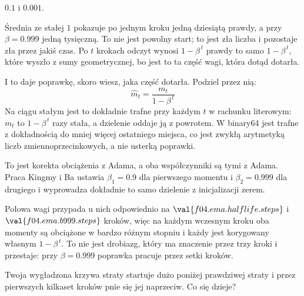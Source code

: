 \begin{fr}
\begin{ansblock}
$\num{0.1}$ i $\num{0.001}$.
\end{ansblock}

Średnia ze stałej $1$ pokazuje po jednym kroku jedną dziesiątą prawdy, a
przy $\beta = \num{0.999}$ jedną tysięczną. To nie jest powolny start; to jest
zła liczba i pozostaje zła przez jakiś czas. Po $t$ krokach odczyt wynosi
$1 - \beta^{\,t}$ prawdy \dash{} to samo $1 - \beta^{\,t}$, które wyszło z
sumy geometrycznej, bo jest to ta część wagi, która dotąd dotarła.

I to daje poprawkę, skoro wiesz, jaka część dotarła. Podziel przez nią:
\[ \hat{m}_t = \frac{m_t}{1 - \beta^{\,t}} \]
Na ciągu stałym jest to dokładnie trafne przy każdym $t$ w rachunku
literowym: $m_t$ to $1 - \beta^{\,t}$ razy stała, a dzielenie oddaje ją z
powrotem. W binary64 jest trafne z dokładnością do mniej więcej ostatniego
miejsca, co jest zwykłą arytmetyką liczb zmiennoprzecinkowych, a nie usterką
poprawki.

\begin{aibox}
To jest korekta obciążenia z Adama, a oba współczynniki są tymi z Adama.
Praca Kingmy i Ba ustawia $\beta_1 = \num{0.9}$ dla pierwszego momentu i
$\beta_2 = \num{0.999}$ dla drugiego i wyprowadza dokładnie to samo dzielenie
z inicjalizacji zerem.

Połowa wagi przypada u nich odpowiednio na $\val{f04.ema.halflife.steps}$ i
$\val{f04.ema.b999.steps}$ kroków, więc na każdym wczesnym kroku oba momenty
są obciążone w bardzo różnym stopniu i każdy jest korygowany własnym
$1 - \beta^{\,t}$. To nie jest drobiazg, który ma znaczenie przez trzy kroki i
przestaje: przy $\beta = \num{0.999}$ poprawka pracuje przez setki kroków.
\end{aibox}

Twoja wygładzona krzywa straty startuje dużo poniżej prawdziwej straty i przez
pierwszych kilkaset kroków pnie się jej naprzeciw. Co się dzieje?
\nextframe
\end{fr}

